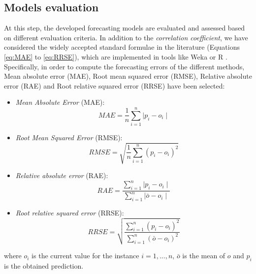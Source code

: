 \documentclass[a4paper,10pt,twocolumn,preprint,3p]{elsarticle}
\begin{document}
\subsection{Models evaluation}
\label{subsec:models_evaluation}

At this step, the developed forecasting models are evaluated and assessed based on different evaluation criteria. In addition to the \textit{correlation coefficient}, we have considered the widely accepted standard formulae in the literature \cite{gepsoft} (Equations \ref{eq:MAE} to \ref{eq:RRSE}), which are implemented in tools like Weka \cite{pentaho,Witten2011} or R \cite{otexts,Hyndman2013}.
Specifically, in order to compute the forecasting errors of the different methods, Mean absolute error (MAE), Root mean squared error (RMSE), Relative absolute error (RAE) and Root relative squared error (RRSE) have been selected:

\begin{itemize}
  \item \emph{Mean Absolute Error} (MAE):
        \begin{equation}\label{eq:MAE}
            MAE = \frac{1}{n}\sum_{i=1}^n {\mid p_i - o_i\mid}
        \end{equation}

  \item \emph{Root Mean Squared Error} (RMSE):
        \begin{equation}\label{eq:RMSE}
            RMSE = \sqrt{ \frac{1}{n}\sum_{i=1}^n {(p_i - o_i)}^2 }
        \end{equation}

  \item \emph{Relative absolute error} (RAE):
        \begin{equation}\label{eq:RAE}
            RAE = \frac{ \sum_{i=1}^n {\mid p_i - o_i\mid} }{ \sum_{i=1}^n {\mid \bar{o} - o_i\mid} }
        \end{equation}

  \item \emph{Root relative squared error} (RRSE):
        \begin{equation}\label{eq:RRSE}
            RRSE = \sqrt{ \frac{ \sum_{i=1}^n {(p_i - o_i)}^2  }{ \sum_{i=1}^n {(\bar{o} - o_i)}^2 }  }
        \end{equation}
\end{itemize}
where $o_i$ is the current value for the instance $i = {1,...,n}$, $\bar{o}$ is the mean of $o$ and $p_i$ is the obtained prediction.
\end{document}

